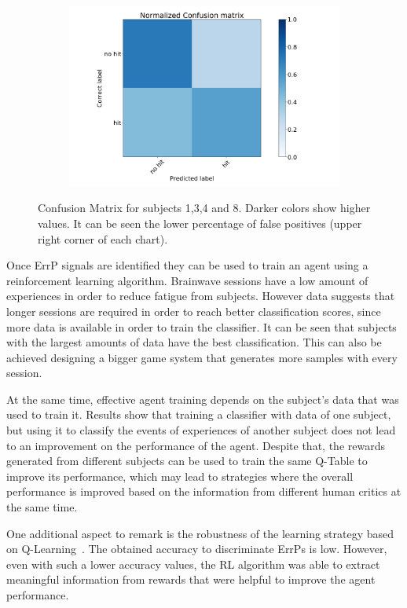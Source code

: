 \documentclass[journal]{IEEEtran}
\begin{document}
{{\begin{figure}[h!]
\begin{subfigure}{0.5\textwidth}
\includegraphics[scale=0.12]{Images/Classification_test/matrix_h.png}
\end{subfigure}
\caption{Confusion Matrix for subjects 1,3,4 and 8. Darker colors show higher values.  It can be seen the lower percentage of false positives (upper right corner of each chart).}
\label{fig:confusionmatrix}
\end{figure}

Once ErrP signals are identified they can be used to train an agent using a reinforcement learning algorithm. Brainwave sessions have a low amount of experiences in order to reduce fatigue from subjects. However data suggests that longer sessions are required in order to reach better classification scores, since more data is available in order to train the classifier. It can be seen that subjects with the largest amounts of data have the best classification. This can also be achieved designing a bigger game system that generates more samples with every session.

At the same time, effective agent training depends on the subject's data that was used to train it. Results show that training a classifier with data of one subject, but using it to classify the events of experiences of another subject does not lead to an improvement on the performance of the agent. Despite that, the rewards generated from different subjects can be used to train the same Q-Table to improve its performance, which may lead to strategies where the overall performance is improved based on the information from different human critics at the same time.

One additional aspect to remark is the robustness of the learning strategy based on Q-Learning~\cite{Bauer2015,Rubin2012}.  The obtained accuracy to discriminate ErrPs is low.  However, even with such a lower accuracy values, the RL algorithm was able to extract meaningful information from rewards that were helpful to improve the agent performance.  

}}
\end{document}
